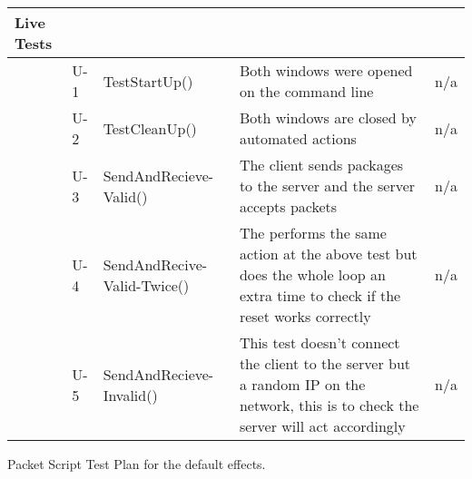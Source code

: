 \begin{longtable}{| p{1.5cm} | p{1.5cm} | p{3cm} | p{4cm} | p{3cm} |}
		Live Tests &&&& \\ \hline
		&U-1& TestStartUp() & Both windows were opened on the command line & n/a \\ \hline
		&U-2& TestCleanUp() & Both windows are closed by automated actions & n/a \\ \hline
		&U-3& SendAndRecieve-Valid() & The client sends packages to the server and the server accepts packets & n/a \\ \hline
		&U-4& SendAndRecive-Valid-Twice() & The performs the same action at the above test but does the whole loop an extra time to check if the reset works correctly & n/a \\ \hline
		&U-5& SendAndRecieve-Invalid() & This test doesn't connect the client to the server but a random IP on the network, this is to check the server will act accordingly & n/a \\ \hline
\end{longtable}

Packet Script Test Plan for the default effects.

